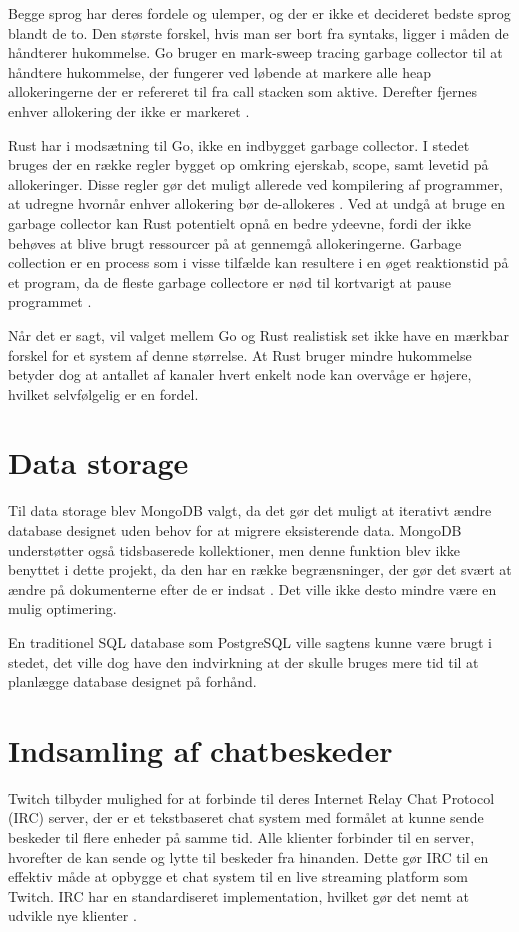 \documentclass{article}
\begin{document}
Begge sprog har deres fordele og ulemper, og der er ikke et decideret bedste sprog blandt de to. Den største forskel, hvis man ser bort fra syntaks, ligger i måden de håndterer hukommelse. Go bruger en mark-sweep tracing garbage collector til at håndtere hukommelse, der fungerer ved løbende at markere alle heap allokeringerne der er refereret til fra call stacken som aktive. Derefter fjernes enhver allokering der ikke er markeret \cite{go_guide_nodate}.

Rust har i modsætning til Go, ikke en indbygget garbage collector. I stedet bruges der en række regler bygget op omkring ejerskab, scope, samt levetid på allokeringer. Disse regler gør det muligt allerede ved kompilering af programmer, at udregne hvornår enhver allokering bør de-allokeres \cite{rust_what_nodate}. Ved at undgå at bruge en garbage collector kan Rust potentielt opnå en bedre ydeevne, fordi der ikke behøves at blive brugt ressourcer på at gennemgå allokeringerne. Garbage collection er en process som i visse tilfælde kan resultere i en øget reaktionstid på et program, da de fleste garbage collectore er nød til kortvarigt at pause programmet \cite{howarth_why_2020}.

Når det er sagt, vil valget mellem Go og Rust realistisk set ikke have en mærkbar forskel for et system af denne størrelse. At Rust bruger mindre hukommelse betyder dog at antallet af kanaler hvert enkelt node kan overvåge er højere, hvilket selvfølgelig er en fordel.


\section{Data storage}
Til data storage blev MongoDB valgt, da det gør det muligt at iterativt ændre database designet uden behov for at migrere eksisterende data.
MongoDB understøtter også tidsbaserede kollektioner, men denne funktion blev ikke benyttet i dette projekt, da den har en række begrænsninger, der gør det svært at ændre på dokumenterne efter de er indsat \cite{mongodb_time_nodate}. Det ville ikke desto mindre være en mulig optimering.

En traditionel SQL database som PostgreSQL ville sagtens kunne være brugt i stedet, det ville dog have den indvirkning at der skulle bruges mere tid til at planlægge database designet på forhånd.

\section{Indsamling af chatbeskeder}
Twitch tilbyder mulighed for at forbinde til deres Internet Relay Chat Protocol (IRC) server, der er et tekstbaseret chat system med formålet at kunne sende beskeder til flere enheder på samme tid. Alle klienter forbinder til en server, hvorefter de kan sende og lytte til beskeder fra hinanden. Dette gør IRC til en effektiv måde at opbygge et chat system til en live streaming platform som Twitch. IRC har en standardiseret implementation, hvilket gør det nemt at udvikle nye klienter \cite{oikarinen_internet_1993}.
\end{document}
